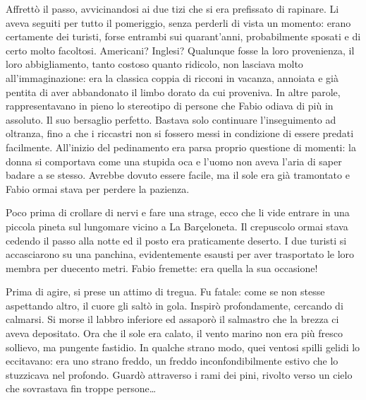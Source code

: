Affrettò il passo, avvicinandosi ai due tizi che si era prefissato di rapinare. Li aveva seguiti per tutto il pomeriggio, senza perderli di vista un momento: erano certamente dei turisti, forse entrambi sui quarant'anni, probabilmente sposati e di certo molto facoltosi. Americani? Inglesi? Qualunque fosse la loro provenienza, il loro abbigliamento, tanto costoso quanto ridicolo, non lasciava molto all'immaginazione: era la classica coppia di ricconi in vacanza, annoiata e già pentita di aver abbandonato il limbo dorato da cui proveniva. In altre parole, rappresentavano in pieno lo stereotipo di persone che Fabio odiava di più in assoluto. Il suo bersaglio perfetto. Bastava solo continuare l'inseguimento ad oltranza, fino a che i riccastri non si fossero messi in condizione di essere predati facilmente. All'inizio del pedinamento era parsa proprio questione di momenti: la donna si comportava come una stupida oca e l'uomo non aveva l'aria di saper badare a se stesso. Avrebbe dovuto essere facile, ma il sole era già tramontato e Fabio ormai stava per perdere la pazienza.

Poco prima di crollare di nervi e fare una strage, ecco che li vide entrare in una piccola pineta sul lungomare vicino a La Barçeloneta. Il crepuscolo ormai stava cedendo il passo alla notte ed il posto era praticamente deserto. I due turisti si accasciarono su una panchina, evidentemente esausti per aver trasportato le loro membra per duecento metri. Fabio fremette: era quella la sua occasione!

Prima di agire, si prese un attimo di tregua. Fu fatale: come se non stesse aspettando altro, il cuore gli saltò in gola. Inspirò profondamente, cercando di calmarsi. Si morse il labbro inferiore ed assaporò il salmastro che la brezza ci aveva depositato. Ora che il sole era calato, il vento marino non era più fresco sollievo, ma pungente fastidio. In qualche strano modo, quei ventosi spilli gelidi lo eccitavano: era uno strano freddo, un freddo inconfondibilmente estivo che lo stuzzicava nel profondo. Guardò attraverso i rami dei pini, rivolto verso un cielo che sovrastava fin troppe persone\ldots

